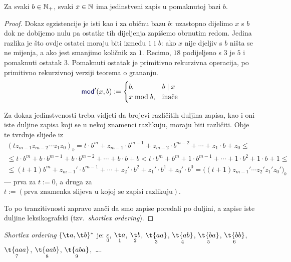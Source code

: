\begin{lema}[{name=[egzistencija i jedinstvenost zapisa u pomaknutoj bazi]}]\label{lm:pomakbaza}
Za svaki $b\in{\mathbb N}_+$, svaki $x\in{\mathbb N}$ ima jedinstveni zapis u pomaknutoj bazi $b$.
\end{lema}
\begin{proof}
Dokaz egzistencije je isti kao i za običnu bazu $b$: uzastopno dijelimo $x$ s $b$ dok ne dobijemo nulu pa ostatke tih dijeljenja zapišemo obrnutim redom. Jedina razlika je što ovdje ostatci moraju biti između $1$ i $b$: ako $x$ nije djeljiv s $b$ ništa se ne mijenja, a ako jest smanjimo količnik za $1$. Recimo, $18$ podijeljeno s $3$ je $5$ i pomaknuti ostatak $3$. Pomaknuti ostatak je primitivno rekurzivna operacija, po primitivno rekurzivnoj verziji teorema o grananju.
\begin{equation}
    \f{mod}'(x,b):=\begin{cases}
        b,&b\mid x\\
        x\bmod b,&\text{inače}
    \end{cases}
\end{equation}

Za dokaz jedinstvenosti treba vidjeti da brojevi različitih duljina zapisa, kao i oni iste duljine zapisa koji se u nekoj znamenci razlikuju, moraju biti različiti. Obje te tvrdnje slijede iz
\begin{multline}
\label{eq:injNSz}
	(tz_{m-1}z_{m-2}\dotsm z_1z_0)_b=
	t\cdot b^m+z_{m-1}\cdot b^{m-1}+z_{m-2}\cdot b^{m-2}+\dotsb
		+z_1\cdot b+z_0\le{}\\{}\le
	t\cdot b^m+b\cdot b^{m-1}+b\cdot b^{m-2}+\dotsb+b\cdot b+b<
	t\cdot b^m+b^m+1\cdot b^{m-1}+\dotsb+1\cdot b^2+1\cdot b+1
		\le{}\\{}\le
	(t+1)b^m+z_{m-1}'\cdot b^{m-1}+\dotsb
		+z_2'\cdot b^2+z_1'\cdot b^1+z_0'\cdot b^0=
        \bigl((t+1)z_{m-1}'\dotsm z_2'z_1'z_0'\bigr)_b
\end{multline}
	--- prva za $t:=0$, a druga za $t:=(\text{prva znamenka slijeva u kojoj se zapisi razlikuju})$. %

To po tranzitivnosti zapravo znači da smo zapise poredali po duljini, a zapise iste duljine leksikografski (tzv\!.\ \emph{shortlex ordering}).
\end{proof}

\begin{primjer}[{name=[\emph{shortlex ordering} riječi nad dvočlanom abecedom]}]
\emph{Shortlex ordering} $\{\t a,\t b\}^*$ je: $\underset{0}{\varepsilon}$,
$\underset{1}{\t a}$,
$\underset{2}{\t b}$,
$\underset{3}{\t{aa}}$,
$\underset{4}{\t{ab}}$,
$\underset{5}{\t{ba}}$,
$\underset{6}{\t{bb}}$,
$\underset{7}{\t{aaa}}$,
$\underset{8}{\t{aab}}$,
$\underset{9}{\t{aba}}$,~\ldots.
\end{primjer}

